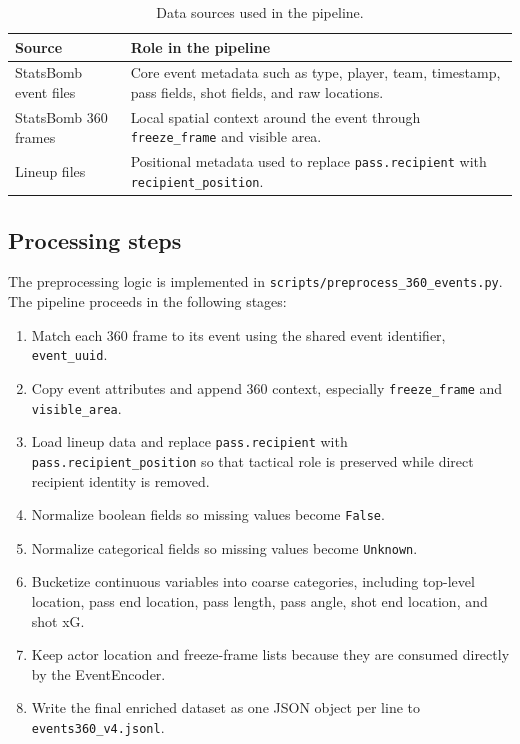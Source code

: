 \documentclass[11pt]{article}
\begin{document}
\begin{table}[H]
\centering
\caption{Data sources used in the pipeline.}
\label{tab:data-sources}
\begin{tabular}{>{\raggedright\arraybackslash}p{} >{\raggedright\arraybackslash}p{}}
\toprule
Source & Role in the pipeline \\
\midrule
StatsBomb event files & Core event metadata such as type, player, team, timestamp, pass fields, shot fields, and raw locations. \\
StatsBomb 360 frames & Local spatial context around the event through \texttt{freeze\_frame} and visible area. \\
Lineup files & Positional metadata used to replace \texttt{pass.recipient} with \texttt{recipient\_position}. \\
\bottomrule
\end{tabular}
\end{table}

\subsection{Processing steps}

The preprocessing logic is implemented in \texttt{scripts/preprocess\_360\_events.py}. The pipeline proceeds in the following stages:
\begin{enumerate}[leftmargin=*]
  \item Match each 360 frame to its event using the shared event identifier, \texttt{event\_uuid}.
  \item Copy event attributes and append 360 context, especially \texttt{freeze\_frame} and \texttt{visible\_area}.
  \item Load lineup data and replace \texttt{pass.recipient} with \texttt{pass.recipient\_position} so that tactical role is preserved while direct recipient identity is removed.
  \item Normalize boolean fields so missing values become \texttt{False}.
  \item Normalize categorical fields so missing values become \texttt{Unknown}.
  \item Bucketize continuous variables into coarse categories, including top-level location, pass end location, pass length, pass angle, shot end location, and shot xG.
  \item Keep actor location and freeze-frame lists because they are consumed directly by the EventEncoder.
  \item Write the final enriched dataset as one JSON object per line to \texttt{events360\_v4.jsonl}.
\end{enumerate}
\end{document}
